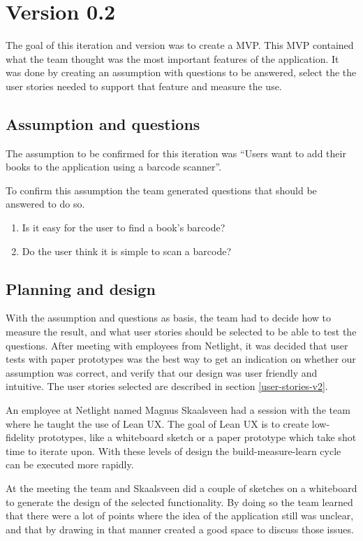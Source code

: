 \section{Version 0.2}

The goal of this iteration and version was to create a \gls{MVP}. This \gls{MVP} contained what the team thought was the most important features of the application. It was done by creating an assumption with questions to be answered, select the the user stories needed to support that feature and measure the use.

\subsection{Assumption and questions}
The assumption to be confirmed for this iteration was
“Users want to add their books to the application using a barcode scanner”.

To confirm this assumption the team generated questions that should be answered to do so.
\begin{enumerate}
    \item Is it easy for the user to find a book’s barcode?
    \item Do the user think it is simple to scan a barcode?
\end{enumerate}


\subsection{Planning and design}
With the assumption and questions as basis, the team had to decide how to measure the result, and what user stories should be selected to be able to test the questions. After meeting with employees from Netlight, it was decided that user tests with paper prototypes was the best way to get an indication on whether our assumption was correct, and verify that our design was user friendly and intuitive. The user stories selected are described in section \ref{user-stories-v2}. 

An employee at Netlight named Magnus Skaalsveen had a session with the team where he taught the use of Lean UX.\cite{lean-ux} The goal of Lean UX is to create low-fidelity prototypes, like a whiteboard sketch or a paper prototype which take shot time to iterate upon. With these levels of design the build-measure-learn cycle can be executed more rapidly.  

At the meeting the team and Skaalsveen did a couple of sketches on a whiteboard to generate the design of the selected functionality. By doing so the team learned that there were a lot of points where the idea of the application still was unclear, and that by drawing in that manner created a good space to discuss those issues. 


